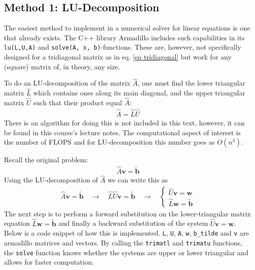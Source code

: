 \documentclass[11pt]{article}
\begin{document}
		\subsection{Method 1: LU-Decomposition}
			The easiest method to implement in a numerical solver for linear equations is one that already exists. The C++ library Armadillo includes such capabilities in its \texttt{lu(L,U,A)} and \texttt{solve(A, x, b)}-functions. These are, however, not specifically designed for a tridiagonal matrix as in eq. \eqref{eq tridiagonal} but work for any (square) matrix of, in theory, any size.
			
			To do an LU-decomposition of the matrix $\hat{A}$, one must find the lower triangular matrix $\hat{L}$ which contains ones along its main diagonal, and the upper triangular matrix $\hat{U}$ such that their product equal $\hat{A}$:
			\begin{align}
				\hat{A} = \hat{L}\hat{U}
			\end{align}
			There is an algorithm for doing this is not included in this text, however, it can be found in this course's lecture notes\cite{comphysLectureNotes}. The computational aspect of interest is the number of FLOPS and for LU-decomposition this number goes as $O(n^3)$.
			
			Recall the original problem:
			\begin{align*}
				\hat{A}\mathbf{v} = \mathbf{\tilde{b}}
			\end{align*}
			Using the LU-decomposition of $\hat{A}$ we can write this as
			\begin{align*}
				\hat{A}\mathbf{v} = \mathbf{\tilde{b}} \quad \rightarrow \quad \hat{L}\hat{U}\mathbf{v} = \mathbf{\tilde{b}} \quad \rightarrow \quad \begin{cases} \hat{U}\mathbf{v} = \mathbf{w} \\ \hat{L}\mathbf{w} = \mathbf{\tilde{b}} \end{cases}
			\end{align*}
			The next step is to perform a forward substitution on the lower-triangular matrix equation $\hat{L}\mathbf{w} = \mathbf{\tilde{b}}$ and finally a backward substitution of the system $\hat{U}\mathbf{v} = \mathbf{w}$. Below is a code snippet of how this is implemented. \texttt{L}, \texttt{U}, \texttt{A}, \texttt{w}, \texttt{b\_tilde} and \texttt{v} are armadillo matrices and vectors. By calling the \texttt{trimatl} and \texttt{trimatu} functions, the \texttt{solve} function knows whether the systems are upper or lower triangular and allows for faster computation.
			
\end{document}
